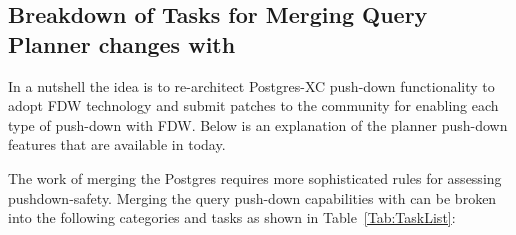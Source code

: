 
\subsection{Breakdown of Tasks for Merging Query Planner changes with \PG}

	In a nutshell the idea is to re-architect Postgres-XC push-down functionality to adopt
	FDW technology and submit patches to the community for enabling each type of push-down
	with FDW.
	Below is an explanation of the planner push-down features that are available in \XC{} today.
	
	The work of merging the Postgres requires more sophisticated rules for assessing
	pushdown-safety.
	Merging the \XC{} query push-down capabilities with \PG{} can be broken into the following
	categories and tasks as shown in Table~\ref{Tab:TaskList}:

